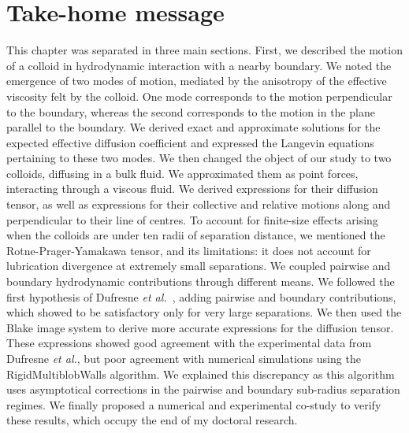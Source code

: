 \section{Take-home message}
This chapter was separated in three main sections. First, we described the motion of a colloid in hydrodynamic interaction with a nearby boundary. We noted the emergence of two modes of motion, mediated by the anisotropy of the effective viscosity felt by the colloid. One mode corresponds to the motion perpendicular to the boundary, whereas the second corresponds to the motion in the plane parallel to the boundary. We derived exact and approximate solutions for the expected effective diffusion coefficient and expressed the Langevin equations pertaining to these two modes. We then changed the object of our study to two colloids, diffusing in a bulk fluid. We approximated them as point forces, interacting through a viscous fluid. We derived expressions for their diffusion tensor, as well as expressions for their collective and relative motions along and perpendicular to their line of centres. To account for finite-size effects arising when the colloids are under ten radii of separation distance, we mentioned the Rotne-Prager-Yamakawa tensor, and its limitations: it does not account for lubrication divergence at extremely small separations. We coupled pairwise and boundary hydrodynamic contributions through different means. We followed the first hypothesis of Dufresne \emph{et al.}~\cite{Dufresne_2000}, adding pairwise and boundary contributions, which showed to be satisfactory only for very large separations. We then used the Blake image system to derive more accurate expressions for the diffusion tensor. These expressions showed good agreement with the experimental data from Dufresne \emph{et al.}, but poor agreement with numerical simulations using the RigidMultiblobWalls algorithm. We explained this discrepancy as this algorithm uses asymptotical corrections in the pairwise and boundary sub-radius separation regimes. We finally proposed a numerical and experimental co-study to verify these results, which occupy the end of my doctoral research.